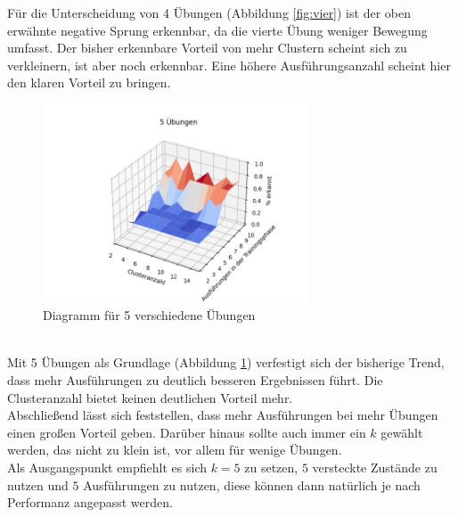 \documentclass{article}
\begin{document}
Für die Unterscheidung von 4 Übungen (Abbildung \ref{fig:vier}) ist der oben erwähnte negative Sprung erkennbar, da die vierte Übung weniger Bewegung umfasst.
Der bisher erkennbare Vorteil von mehr Clustern scheint sich zu verkleinern, ist aber noch erkennbar.
Eine höhere Ausführungsanzahl scheint hier den klaren Vorteil zu bringen.\\
\medskip
\begin{figure}[htbp]
\centering
\includegraphics[width=0.7\textwidth]{figures/5_graph.png}
\caption{Diagramm für 5 verschiedene Übungen}
\label{fig:fuenf}
\end{figure}\\
Mit 5 Übungen als Grundlage (Abbildung \ref{fig:fuenf}) verfestigt sich der bisherige Trend, dass mehr Ausführungen zu deutlich besseren Ergebnissen führt.
Die Clusteranzahl bietet keinen deutlichen Vorteil mehr.\\
Abschließend lässt sich feststellen, dass mehr Ausführungen bei mehr Übungen einen großen Vorteil geben.
Darüber hinaus sollte auch immer ein $k$ gewählt werden, das nicht zu klein ist, vor allem für wenige Übungen.\\
Als Ausgangspunkt empfiehlt es sich $k=5$ zu setzen, $5$ versteckte Zustände zu nutzen und $5$ Ausführungen zu nutzen, diese können dann natürlich je nach Performanz angepasst werden.

\newpage
{}


\end{document}
